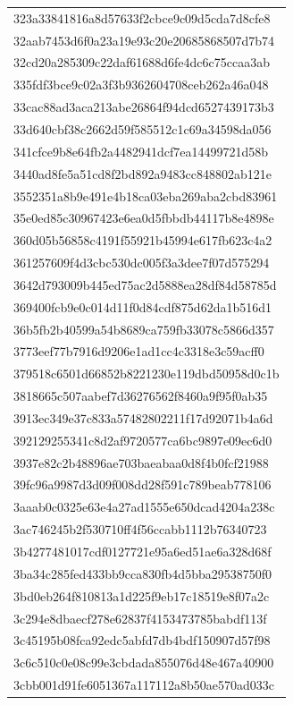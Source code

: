 \begin{tabular}{l}
323a33841816a8d57633f2cbce9c09d5cda7d8cfe8 \\
32aab7453d6f0a23a19e93c20e20685868507d7b74 \\
32cd20a285309c22daf61688d6fe4dc6c75ccaa3ab \\
335fdf3bce9c02a3f3b9362604708ceb262a46a048 \\
33cac88ad3aca213abe26864f94dcd6527439173b3 \\
33d640cbf38c2662d59f585512c1c69a34598da056 \\
341cfce9b8e64fb2a4482941dcf7ea14499721d58b \\
3440ad8fe5a51cd8f2bd892a9483cc848802ab121e \\
3552351a8b9e491e4b18ca03eba269aba2cbd83961 \\
35e0ed85c30967423e6ea0d5fbbdb44117b8e4898e \\
360d05b56858c4191f55921b45994e617fb623c4a2 \\
361257609f4d3cbc530dc005f3a3dee7f07d575294 \\
3642d793009b445ed75ac2d5888ea28df84d58785d \\
369400fcb9e0c014d11f0d84cdf875d62da1b516d1 \\
36b5fb2b40599a54b8689ca759fb33078c5866d357 \\
3773eef77b7916d9206e1ad1cc4c3318e3c59acff0 \\
379518c6501d66852b8221230e119dbd50958d0c1b \\
3818665c507aabef7d36276562f8460a9f95f0ab35 \\
3913ec349e37c833a57482802211f17d92071b4a6d \\
392129255341c8d2af9720577ca6bc9897e09ec6d0 \\
3937e82c2b48896ae703baeabaa0d8f4b0fcf21988 \\
39fc96a9987d3d09f008dd28f591c789beab778106 \\
3aaab0c0325e63e4a27ad1555e650dcad4204a238c \\
3ac746245b2f530710ff4f56ccabb1112b76340723 \\
3b4277481017cdf0127721e95a6ed51ae6a328d68f \\
3ba34c285fed433bb9cca830fb4d5bba29538750f0 \\
3bd0eb264f810813a1d225f9eb17c18519e8f07a2c \\
3c294e8dbaecf278e62837f4153473785babdf113f \\
3c45195b08fca92edc5abfd7db4bdf150907d57f98 \\
3c6c510c0e08c99e3cbdada855076d48e467a40900 \\
3cbb001d91fe6051367a117112a8b50ae570ad033c \\

\end{tabular}
